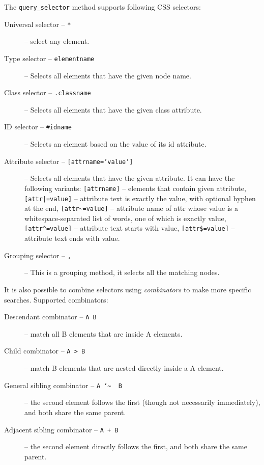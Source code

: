 \documentclass{ltxdoc}
\begin{document}
The \verb|query_selector| method supports following CSS selectors:

\begin{description}
  \item[Universal selector -- \texttt{*}] --  select any element.
  \item[Type selector -- \texttt{elementname}] -- Selects all elements that have the given node name.
  \item[Class selector -- \texttt{.classname}] -- Selects all elements that have the given class attribute.
  \item[ID selector -- \texttt{\#idname}] -- Selects an element based on the value of its id attribute. 
  \item[Attribute selector -- \texttt{[attrname='value']}] -- Selects all elements that have the given attribute.
    It can have the following variants: 
    \texttt{[attrname]} -- elements that contain given attribute, 
    \texttt{[attr\string|=value]} -- attribute text is exactly the value, with optional hyphen at the end,
    \verb|[attr~=value]| -- attribute name of attr whose value is a whitespace-separated list of words, one of which is exactly value,
    \verb|[attr^=value]| -- attribute text starts with value,
    \texttt{[attr\$=value]} -- attribute text ends with value.
  \item[Grouping selector -- \texttt{,}] -- This is a grouping method, it selects all the matching nodes.
\end{description}

\bigskip
\noindent It is also possible to combine selectors using \textit{combinators} to make more specific searches. Supported combinators:

\begin{description}
  \item[Descendant combinator -- \texttt{A B}] -- match all B elements that are inside A elements.
  \item[Child combinator -- \verb|A > B|] -- match B elements that are nested directly inside a A element.
  \item[General sibling combinator -- \texttt{A \char`\~ ~B}] -- the second element
    follows the first (though not necessarily immediately), and both share the
    same parent.
  \item[Adjacent sibling combinator -- \texttt{A + B}] --  the second element directly follows the first, and both share the same parent.
\end{description}
\end{document}
